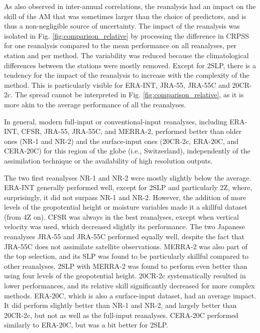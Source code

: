 \documentclass[smallextended]{svjour3}       %
\begin{document}
	As \citet{Dayon2015} also observed in inter-annual correlations, the reanalysis had an impact on the skill of the AM that was sometimes larger than the choice of predictors, and is thus a non-negligible source of uncertainty. The impact of the reanalysis was isolated in Fig. \ref{fig:comparison_relative} by processing the difference in CRPSS for one reanalysis compared to the mean performance on all reanalyses, per station and per method. The variability was reduced because the climatological differences between the stations were mostly removed. Except for 2SLP, there is a tendency for the impact of the reanalysis to increase with the complexity of the method. This is particularly visible for ERA-INT, JRA-55, JRA-55C and 20CR-2c. The spread cannot be interpreted in Fig. \ref{fig:comparison_relative}, as it is more akin to the average performance of all the reanalyses.
	
	In general, modern full-input or conventional-input reanalyses, including ERA-INT, CFSR, JRA-55, JRA-55C, and MERRA-2, performed better than older ones (NR-1 and NR-2) and the surface-input ones (20CR-2c, ERA-20C, and CERA-20C) for this region of the globe (i.e., Switzerland), independently of the assimilation technique or the availability of high resolution outputs.
	
	The two first reanalyses NR-1 and NR-2 were mostly slightly below the average. ERA-INT generally performed well, except for 2SLP and particularly 2Z, where, surprisingly, it did not surpass NR-1 and NR-2. However, the addition of more levels of the geopotential height or moisture variables made it a skillful dataset (from 4Z on). CFSR was always in the best reanalyses, except when vertical velocity was used, which decreased slightly its performance. The two Japanese reanalyses JRA-55 and JRA-55C performed equally well, despite the fact that JRA-55C does not assimilate satellite observations. MERRA-2 was also part of the top selection, and its SLP was found to be particularly skillful compared to other reanalyses. 2SLP with MERRA-2 was found to perform even better than using four levels of the geopotential height. 20CR-2c systematically resulted in lower performances, and its relative skill significantly decreased for more complex methods. ERA-20C, which is also a surface-input dataset, had an average impact. It did perform slightly better than NR-1 and NR-2, and largely better than 20CR-2c, but not as well as the full-input reanalyses. CERA-20C performed similarly to ERA-20C, but was a bit better for 2SLP.
	
\end{document}
